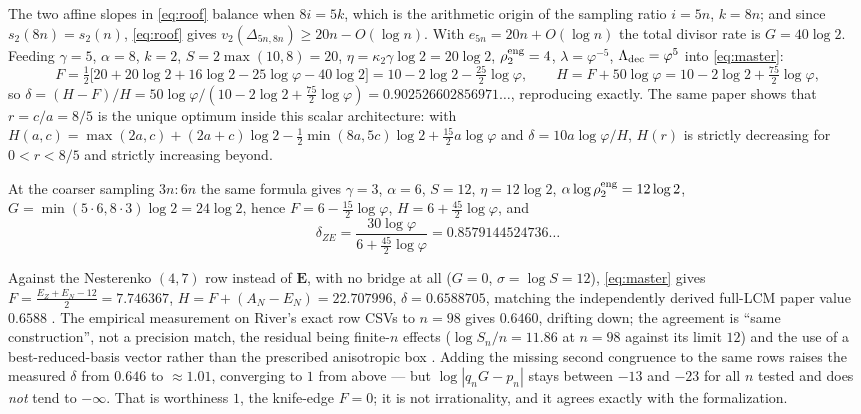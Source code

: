 The two affine slopes in \eqref{eq:roof} balance when $8i=5k$, which is the
arithmetic origin of the sampling ratio $i=5n$, $k=8n$; and since
$s_2(8n)=s_2(n)$, \eqref{eq:roof} gives
$v_2(\Delta_{5n,8n})\ge20n-O(\log n)$.  With $e_{5n}=20n+O(\log n)$ the total
divisor rate is $G=40\log2$.  Feeding
$\gamma=5$, $\alpha=8$, $k=2$, $S=2\max(10,8)=20$, $\eta=\kappa_2\gamma\log2
=20\log2$, $\rho_2^{\rm eng}=4$, $\lambda=\varphi^{-5}$,
$\Lambda_{\rm dec}=\varphi^5$ into \eqref{eq:master}:
\[
F=\tfrac12\bigl[20+20\log2+16\log2-25\log\varphi-40\log2\bigr]
=10-2\log2-\tfrac{25}2\log\varphi,\qquad
H=F+50\log\varphi=10-2\log2+\tfrac{75}2\log\varphi,
\]
so $\delta=(H-F)/H=50\log\varphi/(10-2\log2+\tfrac{75}2\log\varphi)
=0.902526602856971\ldots$, reproducing \cite{ProjCatalan58} exactly.  The same
paper shows that $r=c/a=8/5$ is the unique optimum inside this scalar
architecture: with $H(a,c)=\max(2a,c)+(2a+c)\log2-\tfrac12\min(8a,5c)\log2
+\tfrac{15}2a\log\varphi$ and $\delta=10a\log\varphi/H$, $H(r)$ is strictly
decreasing for $0<r<8/5$ and strictly increasing beyond.

At the coarser sampling $3n:6n$ the same formula gives
$\gamma=3$, $\alpha=6$, $S=12$, $\eta=12\log2$,
$\alpha\log\rho_2^{\rm eng}=12\log2$,
$G=\min(5\cdot6,8\cdot3)\log2=24\log2$, hence
$F=6-\tfrac{15}2\log\varphi$, $H=6+\tfrac{45}2\log\varphi$, and
\[
\delta_{ZE}=\frac{30\log\varphi}{6+\tfrac{45}2\log\varphi}
=0.8579144524736\ldots
\]

Against the Nesterenko $(4,7)$ row instead of $\mathbf E$, with no bridge at
all ($G=0$, $\sigma=\log S=12$), \eqref{eq:master} gives
$F=\tfrac{E_Z+E_N-12}2=7.746367$, $H=F+(A_N-E_N)=22.707996$,
$\delta=0.6588705$, matching the independently derived full-LCM paper value
$0.6588$ \cite{ProjCatalanLCM}.  The empirical measurement on River's exact
row CSVs to $n=98$ gives $0.6460$, drifting down; the agreement is ``same
construction'', not a precision match, the residual being finite-$n$ effects
($\log S_n/n=11.86$ at $n=98$ against its limit $12$) and the use of a
best-reduced-basis vector rather than the prescribed anisotropic box
\cite[\S15]{ProjZeta3}.  Adding the missing second congruence to the same rows
raises the measured $\delta$ from $0.646$ to $\approx1.01$, converging to $1$
from above --- but $\log|q_nG-p_n|$ stays between $-13$ and $-23$ for all $n$
tested and does \emph{not} tend to $-\infty$.  That is worthiness $1$, the
knife-edge $F=0$; it is not irrationality, and it agrees exactly with the
formalization.

